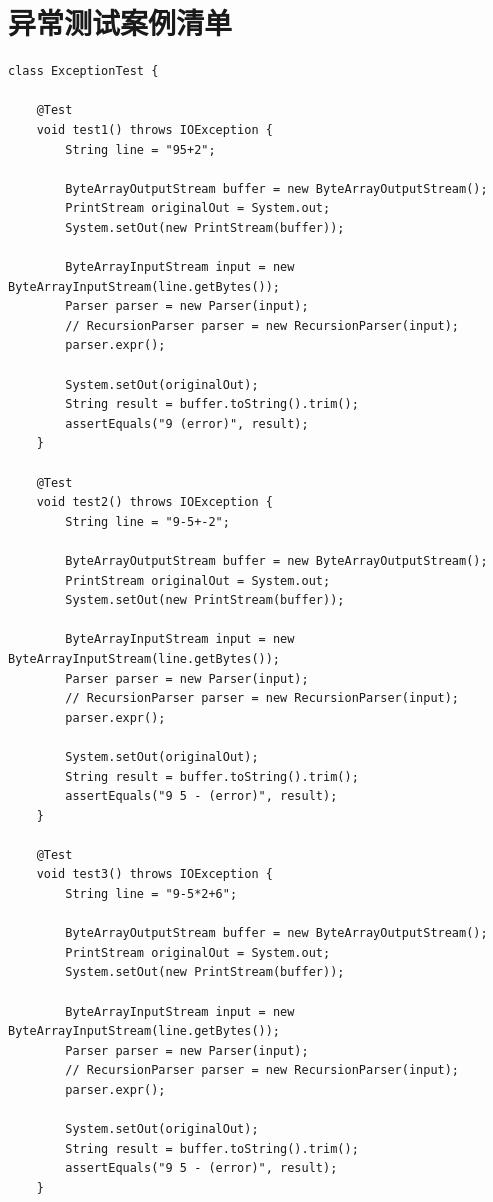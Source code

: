 \documentclass[a4paper, twoside, utf8]{ctexart}
\begin{document}
    \section{异常测试案例清单}

    \begin{verbatim}
class ExceptionTest {

    @Test
    void test1() throws IOException {
        String line = "95+2";

        ByteArrayOutputStream buffer = new ByteArrayOutputStream();
        PrintStream originalOut = System.out;
        System.setOut(new PrintStream(buffer));

        ByteArrayInputStream input = new ByteArrayInputStream(line.getBytes());
        Parser parser = new Parser(input);
        // RecursionParser parser = new RecursionParser(input);
        parser.expr();

        System.setOut(originalOut);
        String result = buffer.toString().trim();
        assertEquals("9 (error)", result);
    }

    @Test
    void test2() throws IOException {
        String line = "9-5+-2";

        ByteArrayOutputStream buffer = new ByteArrayOutputStream();
        PrintStream originalOut = System.out;
        System.setOut(new PrintStream(buffer));

        ByteArrayInputStream input = new ByteArrayInputStream(line.getBytes());
        Parser parser = new Parser(input);
        // RecursionParser parser = new RecursionParser(input);
        parser.expr();

        System.setOut(originalOut);
        String result = buffer.toString().trim();
        assertEquals("9 5 - (error)", result);
    }

    @Test
    void test3() throws IOException {
        String line = "9-5*2+6";

        ByteArrayOutputStream buffer = new ByteArrayOutputStream();
        PrintStream originalOut = System.out;
        System.setOut(new PrintStream(buffer));

        ByteArrayInputStream input = new ByteArrayInputStream(line.getBytes());
        Parser parser = new Parser(input);
        // RecursionParser parser = new RecursionParser(input);
        parser.expr();

        System.setOut(originalOut);
        String result = buffer.toString().trim();
        assertEquals("9 5 - (error)", result);
    }


\end{verbatim}
\end{document}
